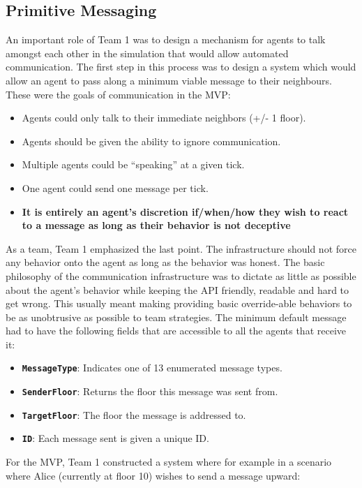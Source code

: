 \documentclass{article}
\begin{document}
\subsection{Primitive Messaging}
An important role of Team 1 was to design a mechanism for agents to talk amongst each other in the simulation that would allow automated communication. The first step in this process was to design a system which would allow an agent to pass along a minimum viable message to their neighbours. These were the goals of communication in the MVP:
\begin{itemize}
    \item Agents could only talk to their immediate neighbors (+/- 1 floor).
    \item Agents should be given the ability to ignore communication.
    \item Multiple agents could be “speaking” at a given tick.
    \item One agent could send one message per tick.
    \item \textbf{It is entirely an agent's discretion if/when/how they wish to react to a message as long as their behavior is not deceptive}
\end{itemize}
As a team, Team 1 emphasized the last point. The infrastructure should not force any behavior onto the agent as long as the behavior was honest. The basic philosophy of the communication infrastructure was to dictate as little as possible about the agent's behavior while keeping the API friendly, readable and hard to get wrong. This usually meant making providing basic override-able behaviors to be as unobtrusive as possible to team strategies. \newline
The minimum default message had to have the following fields that are accessible to all the agents that receive it:
\begin{itemize}
    \item \textbf{\texttt{MessageType}}: Indicates one of 13 enumerated message types.
    \item \textbf{\texttt{SenderFloor}}: Returns the floor this message was sent from.
    \item \textbf{\texttt{TargetFloor}}: The floor the message is addressed to.
    \item \textbf{\texttt{ID}}: Each message sent is given a unique ID.
\end{itemize}
\vspace{\baselineskip}
For the MVP, Team 1 constructed a system where for example in a scenario where Alice (currently at floor 10) wishes to send a message upward:
\end{document}
